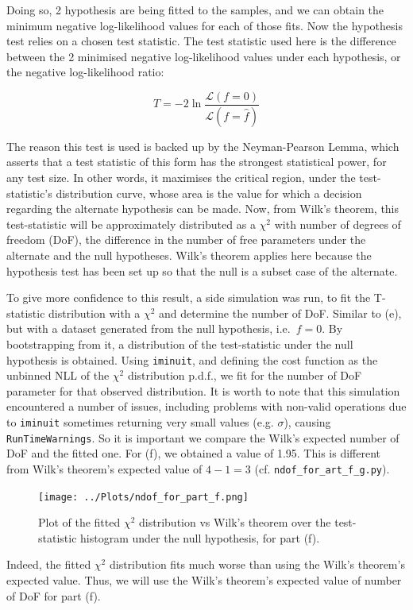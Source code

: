 \documentclass[12pt]{report} %
\begin{document}
Doing so, 2 hypothesis are being fitted to the samples, and we can obtain the minimum negative log-likelihood values for each of those fits\cite{iminuitmethod}. Now the hypothesis test relies on a chosen test statistic. The test statistic used here is the difference between the 2 minimised negative log-likelihood values under each hypothesis, or the negative log-likelihood ratio:

\begin{equation}
    T = -2 \ln{\frac{\mathcal{L}(f = 0)}{\mathcal{L}(f = \hat{f})}}
\end{equation}

The reason this test is used is backed up by the Neyman-Pearson Lemma, which asserts that a test statistic of this form has the strongest statistical power, for any test size. In other words, it maximises the critical region, under the test-statistic's distribution curve, whose area is the value for which a decision regarding the alternate hypothesis can be made\cite[p. 170]{Wass}. Now, from Wilk's theorem, this test-statistic will be approximately distributed as a $\chi^{2}$ with number of degrees of freedom (DoF), the difference in the number of free parameters under the alternate and the null hypotheses\cite{Wilkls1938}. Wilk's theorem applies here because the hypothesis test has been set up so that the null is a subset case of the alternate\cite{huelsenbeck1997phylogeny}.  

To give more confidence to this result, a side simulation was run, to fit the T-statistic distribution with a $\chi^{2}$ and determine the number of DoF. Similar to (e), but with a dataset generated from the null hypothesis, i.e.\ $f=0$. By bootstrapping from it, a distribution of the test-statistic under the null hypothesis is obtained. Using \texttt{iminuit}, and defining the cost function as the unbinned NLL of the $\chi^{2}$ distribution p.d.f., we fit for the number of DoF parameter for that observed distribution\cite{iminuitmethod}. It is worth to note that this simulation encountered a number of issues, including problems with non-valid operations due to \texttt{iminuit} sometimes returning very small values (e.g. $\sigma$), causing \texttt{RunTimeWarnings}. So it is important we compare the Wilk's expected number of DoF and the fitted one. For (f), we obtained a value of 1.95. This is different from Wilk's theorem's expected value of $4 - 1 = 3$ (cf. \texttt{ndof\_for\_art\_f\_g.py}).

\begin{figure}[htb]
    \centering
    \texttt{[image: ../Plots/ndof\_for\_part\_f.png]}
    \captionsetup{margin=1.3cm}
    \caption[width=0.2\pdfpagewidth]{Plot of the fitted $\chi^{2}$ distribution vs Wilk's theorem over the test-statistic histogram under the null hypothesis, for part (f).}
\end{figure}
\newpage
Indeed, the fitted $\chi^{2}$ distribution fits much worse than using the Wilk's theorem's expected value. Thus, we will use the Wilk's theorem's expected value of number of DoF for part (f).  
\end{document}
